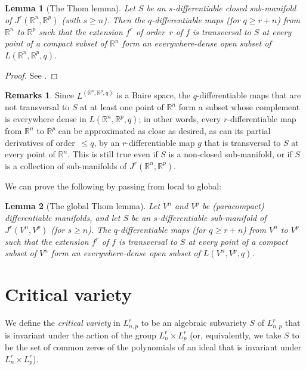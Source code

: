 \documentclass{article}
\theoremstyle{plain}
\newtheorem*{lemma*}{Lemma}
\theoremstyle{definition}
\newtheorem*{remarks*}{Remarks}
\newcommand{\RR}{\mathbb{R}}
\renewcommand{\geq}{\geqslant}
\renewcommand{\leq}{\leqslant}
\newcommand{\oldpage}[1]{\marginpar{\footnotesize$\Big\vert$ \textit{p.~#1}}}
\begin{document}
\begin{lemma*}[The Thom lemma]
  Let $S$ be an $s$-differentiable closed sub-manifold of $J^r(\RR^n,\RR^p)$ (with $s\geq n$).
  Then the $q$-differentiable maps (for $q\geq r+n$) from $\RR^n$
\oldpage{7-04}
  to $\RR^p$ such that the extension $f^r$ of order~$r$ of $f$ is transversal to $S$ at every point of a compact subset of $\RR^n$ form an everywhere-dense open subset of $L(\RR^n,\RR^p,q)$.
\end{lemma*}

\begin{proof}
  See \cite{3}.
\end{proof}

\begin{remarks*}
  Since $L^(\RR^n,\RR^p,q)$ is a Baire space, the $q$-differentiable maps that are not transversal to $S$ at at least one point of $\RR^n$ form a subset whose complement is everywhere dense in $L(\RR^n,\RR^p,q)$;
  in other words, every $r$-differentiable map from $\RR^n$ to $\RR^p$ can be approximated as close as desired, as can its partial derivatives of order~$\leq q$, by an $r$-differentiable map $g$ that is transversal to $S$ at every point of $\RR^n$.
  This is still true even if $S$ is a non-closed sub-manifold, or if $S$ is a collection of sub-manifolds of $J^r(\RR^n,\RR^p)$.
\end{remarks*}

We can prove the following by passing from local to global:

\begin{lemma*}[The global Thom lemma]
  Let $V^n$ and $V^p$ be (paracompact) differentiable manifolds, and let $S$ be an $s$-differentiable sub-manifold of $J^r(V^n,V^p)$ (for $s\geq n$).
  The $q$-differentiable maps (for $q\geq r+n$) from $V^n$ to $V^p$ such that the extension $f^r$ of $f$ is transversal to $S$ at every point of a compact subset of $V^n$ form an everywhere-dense open subset of $L(V^n,V^p,q)$.
\end{lemma*}


\section{Critical variety}
\label{3}

We define the \emph{critical variety} in $L_{n,p}^r$ to be an algebraic subvariety $S$ of $L_{n,p}^r$ that is invariant under the action of the group $L_n^r\times L_p^r$ (or, equivalently, we take $S$ to be the set of common zeros of the polynomials of an ideal that is invariant under $L_n^r\times L_p^r$).
\end{document}
